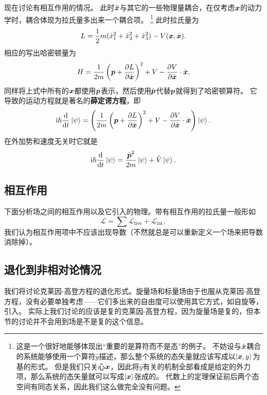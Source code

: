 \documentclass[hyperref, UTF8, a4paper]{ctexart}
\newcommand*{\ii}{\mathrm{i}}
\begin{document}
现在讨论有相互作用的情况。
此时$\hat{\vb*{x}}$与其它的一些物理量耦合，在仅考虑$\vb*{x}$的动力学时，耦合体现为拉氏量多出来一个耦合项。%
\footnote{这是一个很好地能够体现出“重要的是算符而不是态”的例子。
不妨设与$\hat{\vb*{x}}$耦合的系统能够使用一个算符$\hat{y}$描述，那么整个系统的态矢量就应该写成以$\ket{\vb*{x}, y}$为基的形式。
但是我们只关心$\vb*{x}$，因此将$\hat{y}$有关的机制全部看成是给定的外力项，那么系统的态矢量就可以写成$\ket{\vb*{x}}$张成的。
代数上的定理保证前后两个态空间有同态关系，因此我们这么做完全没有问题。
}
此时拉氏量为
\begin{equation}
    L = \frac{1}{2} m (\dot{x}_1^2 + \dot{x}_2^2 + \dot{x}_3^2) - V(\vb*{x}, \dot{\vb*{x}}).
\end{equation}
相应的写出哈密顿量为
\[
    H = \frac{1}{2m} \left(\vb*{p} + \pdv{L}{\dot{\vb*{x}}}\right)^2 + V - \pdv{V}{\dot{\vb*{x}}} \cdot \dot{\vb*{x}},
\]
同样将上式中所有的$\vb*{x}$都使用$\vb*{p}$表示，然后使用$\hat{\vb*{p}}$代替$\vb*{p}$就得到了哈密顿算符。
它导致的运动方程就是著名的\textbf{薛定谔方程}，即
\begin{equation}
    \ii \hbar \dv{t} \ket{\psi} = \left( \frac{1}{2m} \left(\vb*{p} + \pdv{L}{\dot{\vb*{x}}}\right)^2 + V - \pdv{V}{\dot{\vb*{x}}} \cdot \dot{\vb*{x}} \right) \ket{\psi}.
\end{equation}
在外加势和速度无关时它就是
\begin{equation}
    \ii \hbar \dv{t} \ket{\psi} = \frac{\hat{\vb*{p}}^2}{2m} \ket{\psi} + \hat{V} \ket{\psi}.
\end{equation}

\subsection{相互作用}

下面分析场之间的相互作用以及它引入的物理。带有相互作用的拉氏量一般形如
\begin{equation}
    \mathcal{L} = \sum \mathcal{L}_\text{free} + \mathcal{L}_\text{int},
\end{equation}
我们认为相互作用项中不应该出现导数（不然就总是可以重新定义一个场来把导数消除掉）。

\subsection{退化到非相对论情况}

我们将讨论克莱因-高登方程的退化形式。旋量场和标量场由于也服从克莱因-高登方程，没有必要单独考虑——它们多出来的自由度可以使用其它方式，如自旋等，引入。
实际上我们讨论的应该是复的克莱因-高登方程，因为旋量场是复的，但本节的讨论并不会用到场是不是复的这个信息。
\end{document}
